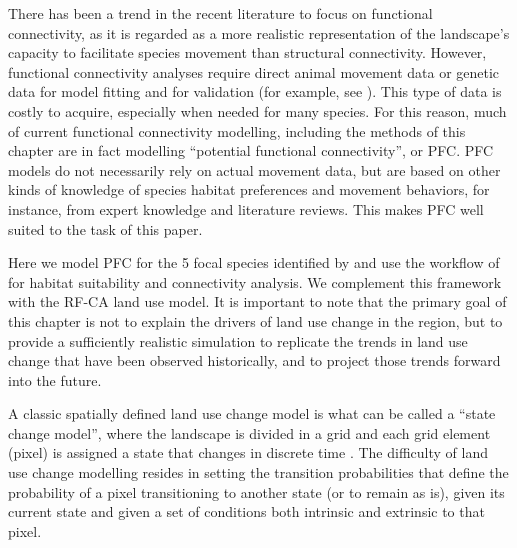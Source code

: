 There has been a trend in the recent literature to focus on functional connectivity, as it is regarded as a more realistic representation of  the landscape’s capacity to facilitate species movement than structural connectivity. However, functional connectivity analyses require direct animal movement data or genetic data for model fitting and for validation (for example, see \cite{beyer_functional_2013, milanesi_three-dimensional_2017}). This type of data is costly to acquire, especially when needed for many species. For this reason, much of current functional connectivity modelling, including the methods of this chapter are in fact modelling “potential functional connectivity”, or PFC. PFC models do not necessarily rely on actual movement data, but are based on other kinds of knowledge of species habitat preferences and movement behaviors, for instance, from expert knowledge and literature reviews. This makes PFC well suited to the task of this paper.

Here we model  PFC for the 5 focal species identified by  \cite{meurant_selecting_2018} and use the workflow of \citep{rayfield_priorisation_2018} for habitat suitability and connectivity analysis. We complement this framework with the RF-CA land use model. It is important to note that the primary goal of this chapter is not to explain the drivers of land use change in the region, but to provide a sufficiently realistic simulation to replicate the trends in land use change that have been observed historically, and to project those trends forward into the future. %

A classic spatially defined land use change model is what can be called a “state change model”, where the landscape is divided in a grid and each grid element (pixel) is assigned a state that changes in discrete time \citep{daniel_state-and-transition_2016}. The difficulty of land use change modelling resides in setting the transition probabilities that define the probability of a pixel transitioning to another state (or to remain as is), given its current state and given a set of conditions both intrinsic and extrinsic to that pixel.

